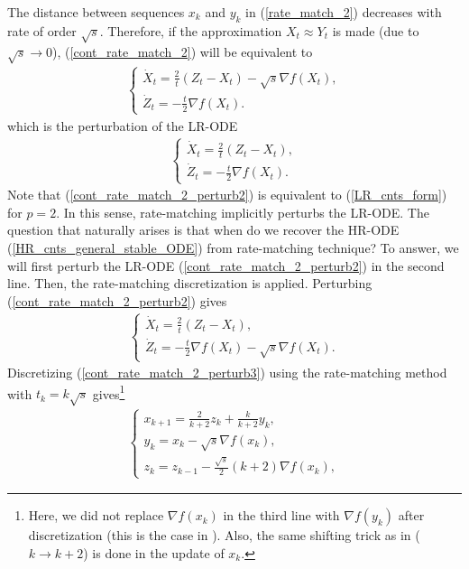 \documentclass{article}
\theoremstyle{plain}
\theoremstyle{definition}
\theoremstyle{remark}
\begin{document}
The distance between sequences \(x_k\) and \(y_k\) in (\ref{rate_match_2}) decreases with rate of order \(\sqrt{s}\). Therefore, if the approximation \(X_t\approx Y_t\) is made (due to \(\sqrt{s}\rightarrow 0\)), (\ref{cont_rate_match_2}) will be equivalent to
\begin{align}\label{cont_rate_match_2_perturb}
    \left\{\begin{array}{l}
         \dot X_t = \frac{2}{t}(Z_t-X_t)-\sqrt{s}\nabla f(X_t),  \\
          \dot Z_t = -\frac{t}{2}\nabla f(X_t).
    \end{array}
    \right.
\end{align}
which is the perturbation of the LR-ODE
\begin{align}\label{cont_rate_match_2_perturb2}
    \left\{\begin{array}{l}
         \dot X_t = \frac{2}{t}(Z_t-X_t),  \\
          \dot Z_t = -\frac{t}{2}\nabla f(X_t).
    \end{array}
    \right.
\end{align}
Note that (\ref{cont_rate_match_2_perturb2}) is equivalent to (\ref{LR_cnts_form}) for \(p=2\). In this sense, rate-matching implicitly perturbs the LR-ODE. The question that naturally arises is that when do we recover the HR-ODE (\ref{HR_cnts_general_stable_ODE}) from rate-matching technique? To answer, we will first perturb the LR-ODE (\ref{cont_rate_match_2_perturb2}) in the second line. Then, the rate-matching discretization is applied. Perturbing (\ref{cont_rate_match_2_perturb2}) gives
\begin{align}\label{cont_rate_match_2_perturb3}
    \left\{\begin{array}{l}
         \dot X_t = \frac{2}{t}(Z_t-X_t),  \\
          \dot Z_t = -\frac{t}{2}\nabla f(X_t)-\sqrt{s}\nabla f(X_t).
    \end{array}
    \right.
\end{align}
Discretizing (\ref{cont_rate_match_2_perturb3}) using the rate-matching method with \(t_k=k\sqrt{s}\) gives\footnote{Here, we did not replace \(\nabla f(x_k)\) in the third line with \(\nabla f(y_k)\) after discretization (this is the case in \citep{WibisonoE7351}). Also, the same shifting trick as in \citep{WibisonoE7351} (\(k\rightarrow k+2\)) is done in the update of \(x_{k}\).}
\begin{align}\label{rate_match_3}
    \left\{\begin{array}{l}
    x_{k+1}=\frac{2}{k+2}z_k+\frac{k}{k+2}y_k,\\
    y_{k}=x_k-\sqrt{s}\nabla f(x_k),   \\
    z_{k}=z_{k-1} -\frac{\sqrt{s}}{2} (k+2)\nabla f(x_{k})  ,
    \end{array}\right.
\end{align}
\end{document}
